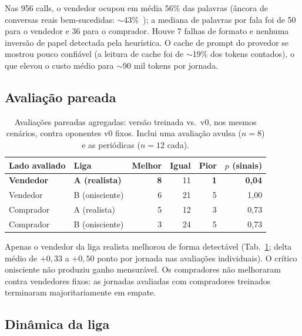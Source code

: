 \documentclass[11pt,a4paper]{article}
\begin{document}
Nas 956 calls, o vendedor ocupou em média 56\% das palavras (âncora de conversas reais bem-sucedidas: $\sim$43\%~\cite{gong2024talk}); a mediana de palavras por fala foi de 50 para o vendedor e 36 para o comprador. Houve 7 falhas de formato e nenhuma inversão de papel detectada pela heurística. O cache de prompt do provedor se mostrou pouco confiável (a leitura de cache foi de $\sim$19\% dos tokens contados), o que elevou o custo médio para $\sim$90 mil tokens por jornada.

\subsection{Avaliação pareada}

\begin{table}[h]
\centering
\caption{Avaliações pareadas agregadas: versão treinada vs.\ v0, nos mesmos cenários, contra oponentes v0 fixos. Inclui uma avaliação avulsa ($n=8$) e as periódicas ($n=12$ cada).}
\label{tab:pareada}
\begin{tabular}{llrrrr}
\toprule
Lado avaliado & Liga & Melhor & Igual & Pior & $p$ (sinais) \\
\midrule
\textbf{Vendedor} & \textbf{A (realista)} & \textbf{8} & 11 & \textbf{1} & \textbf{0,04} \\
Vendedor & B (onisciente) & 6 & 21 & 5 & 1,00 \\
Comprador & A (realista) & 5 & 12 & 3 & 0,73 \\
Comprador & B (onisciente) & 3 & 24 & 5 & 0,73 \\
\bottomrule
\end{tabular}
\end{table}

Apenas o vendedor da liga realista melhorou de forma detectável (Tab.~\ref{tab:pareada}; delta médio de $+0{,}33$ a $+0{,}50$ ponto por jornada nas avaliações individuais). O crítico onisciente não produziu ganho mensurável. Os compradores não melhoraram contra vendedores fixos: as jornadas avaliadas com compradores treinados terminaram majoritariamente em empate.

\subsection{Dinâmica da liga}
\end{document}
